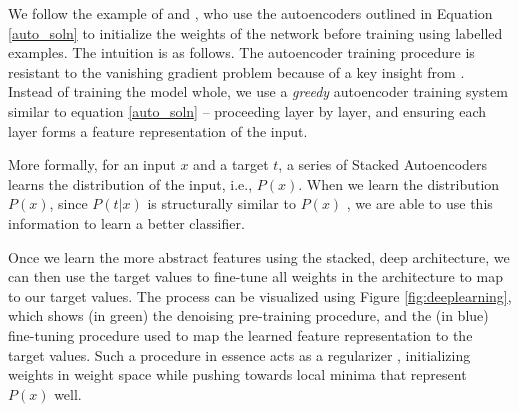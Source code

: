 We follow the example of \citep{Bengio:2007uq} and \citep{Vincent:2010fk}, who use the autoencoders outlined in Equation \eqref{auto_soln} to initialize the weights of the network before training using labelled examples. The intuition is as follows. The autoencoder training procedure is resistant to the vanishing gradient problem because of a key insight from \citep{Hinton:2006vn}. Instead of training the model whole, we use a \emph{greedy} autoencoder training system similar to equation \eqref{auto_soln} -- proceeding layer by layer, and ensuring each layer forms a feature representation of the input.

More formally, for an input $x$ and a target $t$, a series of Stacked Autoencoders learns the distribution of the input, i.e., $P(x)$. When we learn the distribution $P(x)$, since $P(t\vert x)$ is structurally similar to $P(x)$ \citep{Erhan:2010:WUP:1756006.1756025}, we are able to use this information to learn a better classifier. 

Once we learn the more abstract features using the stacked, deep architecture, we can then use the target values to fine-tune \citep{Hinton:2006vn} all weights in the architecture to map to our target values. The process can be visualized using Figure \ref{fig:deeplearning}, which shows (in green) the denoising pre-training procedure, and the (in blue) fine-tuning procedure used to map the learned feature representation to the target values. Such a procedure in essence acts as a regularizer \citep{Bengio2009LearningDeep}, initializing weights in weight space while pushing towards local minima that represent $P(x)$ well.


